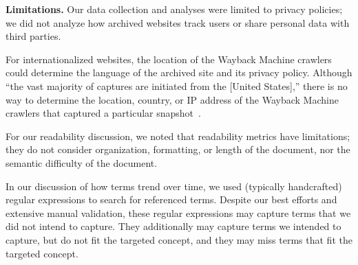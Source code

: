 \textbf{Limitations.}
Our data collection and analyses were limited to privacy policies; we did not analyze how archived websites track users or share personal data with third parties. 

For internationalized websites, the location of the Wayback Machine crawlers could determine the language of the archived site and its privacy policy. 
Although ``the vast majority of captures are initiated from the [United States],'' there is no way to determine the location, country, or IP address of the Wayback Machine crawlers that captured a particular snapshot~\cite{crawl-location-tweet-by-graham}.


For our readability discussion, we noted that readability metrics have limitations; they do not consider organization, formatting, or length of the document, nor the semantic difficulty of the document. 

In our discussion of how terms trend over time, we used (typically handcrafted) regular expressions to search for referenced terms. Despite our best efforts and extensive manual validation, these regular expressions may capture terms that we did not intend to capture. They additionally may capture terms we intended to capture, but do not fit the targeted concept, and they may miss terms that fit the targeted concept. 
